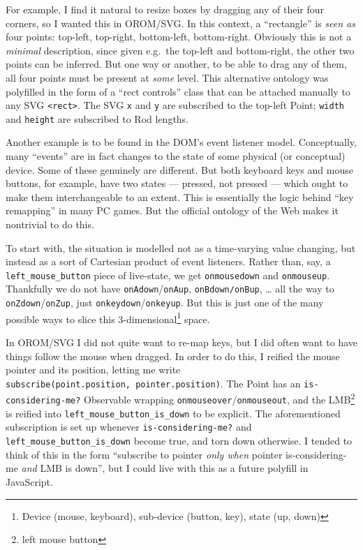 \documentclass[english,submission]{programming}
\begin{document}
  For example, I find it natural to resize boxes by dragging any of their
  four corners, so I wanted this in OROM/SVG. In this context, a
  ``rectangle'' is \emph{seen as} four points: top-left, top-right,
  bottom-left, bottom-right. Obviously this is not a \emph{minimal}
  description, since given e.g.~the top-left and bottom-right, the other
  two points can be inferred. But one way or another, to be able to drag
  any of them, all four points must be present at \emph{some} level. This
  alternative ontology was polyfilled in the form of a ``rect controls''
  class that can be attached manually to any SVG
  \texttt{\textless{}rect\textgreater{}}. The SVG \texttt{x} and
  \texttt{y} are subscribed to the top-left Point; \texttt{width} and
  \texttt{height} are subscribed to Rod lengths.

  Another example is to be found in the DOM's event listener model.
  Conceptually, many ``events'' are in fact changes to the state of some
  physical (or conceptual) device. Some of these genuinely are different.
  But both keyboard keys and mouse buttons, for example, have two states
  --- pressed, not pressed --- which ought to make them interchangeable to
  an extent. This is essentially the logic behind ``key remapping'' in
  many PC games. But the official ontology of the Web makes it nontrivial
  to do this.

  To start with, the situation is modelled not as a time-varying value
  changing, but instead as a sort of Cartesian product of event listeners.
  Rather than, say, a \texttt{left\_mouse\_button} piece of live-state, we
  get \texttt{onmousedown} and \texttt{onmouseup}. Thankfully we do not
  have \texttt{onAdown}/\texttt{onAup}, \texttt{onBdown/onBup}, \ldots{}
  all the way to \texttt{onZdown}/\texttt{onZup}, just
  \texttt{onkeydown}/\texttt{onkeyup}. But this is just one of the many
  possible ways to slice this 3-dimensional\footnote{Device (mouse,
    keyboard), sub-device (button, key), state (up, down)} space.

  In OROM/SVG I did not quite want to re-map keys, but I did often want to
  have things follow the mouse when dragged. In order to do this, I
  reified the mouse pointer and its position, letting me write
  \texttt{subscribe(point.position,\ pointer.position)}. The Point has an
  \texttt{is-considering-me?} Observable wrapping
  \texttt{onmouseover}/\texttt{onmouseout}, and the LMB\footnote{left
    mouse button} is reified into \texttt{left\_mouse\_button\_is\_down}
  to be explicit. The aforementioned subscription is set up whenever
  \texttt{is-considering-me?} and \texttt{left\_mouse\_button\_is\_down}
  become true, and torn down otherwise. I tended to think of this in the
  form ``subscribe to pointer \emph{only when} pointer is-considering-me
  \emph{and} LMB is down'', but I could live with this as a future
  polyfill in JavaScript.
\end{document}
